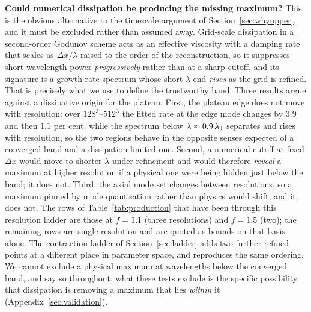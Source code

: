 \documentclass[usenatbib,twoside,twocolumn]{mnras}
\begin{document}
\smallskip\noindent\textbf{Could numerical dissipation be producing the missing maximum?} This is the obvious alternative to the timescale argument of Section~\ref{sec:whyupper}, and it must be excluded rather than assumed away. Grid-scale dissipation in a second-order Godunov scheme acts as an effective viscosity with a damping rate that scales as $\Delta x/\lambda$ raised to the order of the reconstruction, so it suppresses short-wavelength power \emph{progressively} rather than at a sharp cutoff, and its signature is a growth-rate spectrum whose short-$\lambda$ end \emph{rises} as the grid is refined. That is precisely what we use to define the trustworthy band. Three results argue against a dissipative origin for the plateau. First, the plateau edge does not move with resolution: over $128^3$--$512^3$ the fitted rate at the edge mode changes by $3.9$ and then $1.1$ per cent, while the spectrum below $\lambda\approx0.9\,\lambda_{\rm J}$ separates and rises with resolution, so the two regions behave in the opposite senses expected of a converged band and a dissipation-limited one. Second, a numerical cutoff at fixed $\Delta x$ would move to shorter $\lambda$ under refinement and would therefore \emph{reveal} a maximum at higher resolution if a physical one were being hidden just below the band; it does not. Third, the axial mode set changes between resolutions, so a maximum pinned by mode quantisation rather than physics would shift, and it does not. The rows of Table~\ref{tab:production} that have been through this resolution ladder are those at $f=1.1$ (three resolutions) and $f=1.5$ (two); the remaining rows are single-resolution and are quoted as bounds on that basis alone. The contraction ladder of Section~\ref{sec:ladder} adds two further refined points at a different place in parameter space, and reproduces the same ordering. We cannot exclude a physical maximum at wavelengths below the converged band, and say so throughout; what these tests exclude is the specific possibility that dissipation is removing a maximum that lies \emph{within} it (Appendix~\ref{sec:validation}).
\end{document}
